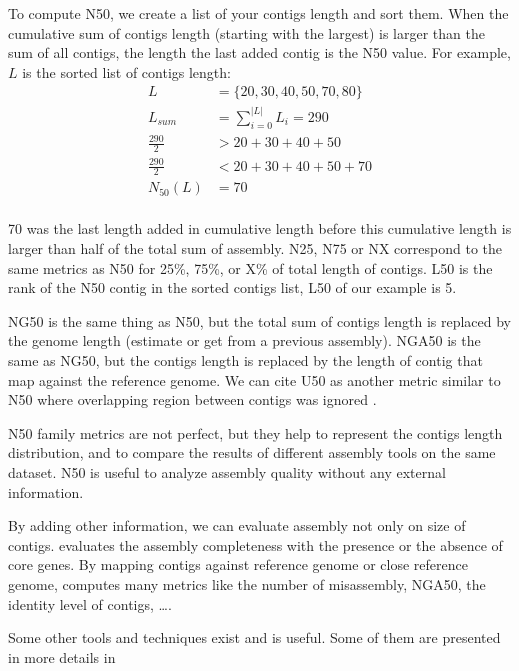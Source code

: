 \documentclass[main.tex]{subfiles}
\begin{document}
To compute N50, we create a list of your contigs length and sort them. When the cumulative sum of contigs length (starting with the largest) is larger than the sum of all contigs, the length the last added contig is the N50 value. For example, $L$ is the sorted list of contigs length: 
\begin{equation}
\begin{aligned}
L &= \{20, 30, 40, 50, 70, 80\} \\
L_{sum} &= \sum\limits_{i=0}^{|L|} L_i = 290 \\
\frac{290}{2} &> 20 + 30 + 40 + 50 \\
\frac{290}{2} &< 20 + 30 + 40 + 50 + 70\\
N_{50}(L) &= 70\\
\end{aligned}
\end{equation}

70 was the last length added in cumulative length before this cumulative length is larger than half of the total sum of assembly.
N25, N75 or NX correspond to the same metrics as N50 for 25\%, 75\%, or X\% of total length of contigs. L50 is the rank of the N50 contig in the sorted contigs list, L50 of our example is 5.

NG50 is the same thing as N50, but the total sum of contigs length is replaced by the genome length (estimate or get from a previous assembly). NGA50 is the same as NG50, but the contigs length is replaced by the length of contig that map against the reference genome. We can cite U50 as another metric similar to N50 where overlapping region between contigs was ignored \cite{U50}.

N50 family metrics are not perfect, but they help to represent the contigs length distribution, and to compare the results of different assembly tools on the same dataset. N50 is useful to analyze assembly quality without any external information.

By adding other information, we can evaluate assembly not only on size of contigs. \cite{busco} evaluates the assembly completeness with the presence or the absence of core genes. By mapping contigs against reference genome or close reference genome, \cite{quast} computes many metrics like the number of misassembly, NGA50, the identity level of contigs, …. 

Some other tools and techniques exist and is useful. Some of them are presented in more details in \cite{seq_assembly_demystified}
\end{document}
